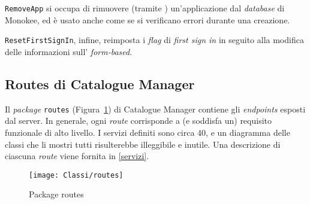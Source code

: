 \texttt{RemoveApp} si occupa di rimuovere (tramite ) un'applicazione dal \textit{database} di Monokee, ed è usato anche come  se si verificano errori durante una creazione.

\texttt{ResetFirstSignIn}, infine, reimposta i \textit{flag} di \textit{first sign in} in seguito alla modifica delle informazioni sull' \textit{form-based}. 

\subsection{Routes di Catalogue Manager}
Il \textit{package} \texttt{routes} (Figura~\ref{fig:routes}) di Catalogue Manager contiene gli \textit{endpoints} esposti dal server. In generale, ogni \textit{route} corrisponde a (e soddisfa un) requisito funzionale di alto livello. I servizi  definiti sono circa 40, e un diagramma delle classi che li mostri tutti risulterebbe illeggibile e inutile. Una descrizione di ciascuna \textit{route} viene fornita in \ref{servizi}.

\begin{figure}[hbpc]
  \begin{center}
    \texttt{[image: Classi/routes]}
  \caption[Package routes]{Package routes}
  \label{fig:routes}
  \end{center} 
\end{figure}
